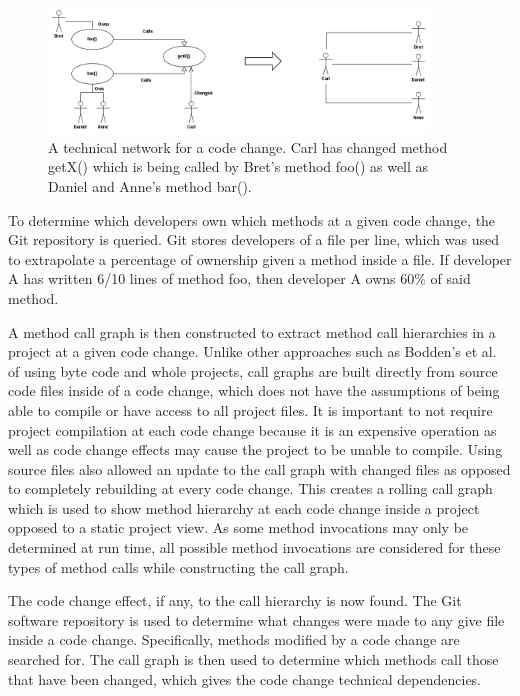 \begin{figure}[ht]
\centering
\includegraphics[width=0.9\textwidth]{figures/TecNetwork}
\caption{A technical network for a code change. Carl has changed method getX() which is being
called by Bret's method foo() as well as Daniel and Anne's method bar().\label{fig:network}}
\end{figure}

To determine which developers own which methods at a given code change,
the Git repository is queried. Git stores developers of a file per line, which was used to extrapolate
a percentage of ownership given a method inside a file. If developer A has written 6/10 lines of 
method foo, then developer A owns 60\% of said method.

A method call graph is then constructed to extract method call hierarchies in a project at a given code change. 
Unlike other approaches such as Bodden's et al.~\cite{Bodden:2003:HVJ} 
of using byte code and whole projects, call graphs are built directly from source code files
inside of a code change, 
which does not have the assumptions of being able to compile or have access to all project 
files. It is important to not require project compilation at each code change because it is
an expensive operation as well as code change effects may cause the project
to be unable to compile. Using source files also allowed an update to the call graph
with changed files as opposed to completely rebuilding at 
every code change. This creates a rolling call graph which 
is used to show method hierarchy at each code change inside a project opposed to
a static project view. As some method invocations may only be determined at run time, all
possible method invocations are considered for these types of method calls while constructing
the call graph.

The code change effect, if any, to the call hierarchy is now found. The Git
software repository is used to determine what changes were made to any give file inside a 
code change. Specifically, methods modified by a code change are searched for. The call graph 
is then used to determine which methods call those that have been changed, which
gives the code change technical dependencies.


